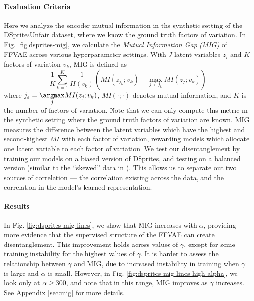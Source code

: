 \paragraph{Evaluation Criteria}
Here we analyze the encoder mutual information in the synthetic setting of the DSpritesUnfair dataset, where we know the ground truth factors of variation.
In Fig. \ref{fig:dsprites-mig}, we calculate the \textit{Mutual Information Gap (MIG)} \citep{chen2018isolating} of FFVAE across various hyperparameter settings.
With $J$ latent variables $z_j$ and $K$ factors of variation $v_k$, MIG is defined as 
\begin{equation}
    \frac{1}{K} \sum_{k=1}^{K} \frac{1}{H(v_k)} (MI (z_{j_k}; v_k) - \max_{j \neq j_k} MI (z_j; v_k))
\end{equation}
where $j_k = \underset{j}{\argmax} MI (z_j; v_k)$, $MI(\cdot; \cdot)$ denotes mutual information, and $K$ is the number of factors of variation.
Note that we can only compute this metric in the synthetic setting where the ground truth factors of variation are known.
MIG measures the difference between the latent variables which have the highest and second-highest $MI$ with each factor of variation, rewarding models which allocate one latent variable to each factor of variation.
We test our disentanglement by training our models on a biased version of DSprites, and testing on a balanced version (similar to the ``skewed'' data in \citet{chen2018isolating}).
This allows us to separate out two sources of correlation --- the correlation existing across the data, and the correlation in the model's learned representation.

\paragraph{Results}

In Fig. \ref{fig:dsprites-mig-lines}, we show that MIG increases with $\alpha$, providing more evidence that the supervised structure of the FFVAE can create disentanglement.
This improvement holds across values of $\gamma$, except for some training instability for the highest values of $\gamma$.
It is harder to assess the relationship between $\gamma$ and MIG, due to increased instability in training when $\gamma$ is large and $\alpha$ is small.
However, in Fig. \ref{fig:dsprites-mig-lines-high-alpha}, we look only at $\alpha \geq 300$, and note that in this range, MIG improves as $\gamma$ increases.
See Appendix \ref{sec:mig} for more details.



